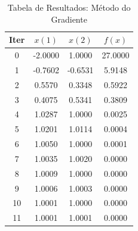 \documentclass[a4paper,12pt,utf8x,notitlepage]{article}
\begin{document}
\begin{table}[!htcb]
  \centering
  \begin{tabular}{|c|c|c|c|}
    \hline
    \rowcolor{kugray5}{}
    Iter  & $x(1)$ & $x(2)$ & $f(x)$\\ \hline
 	 0 &  -2.0000	&  1.0000	  &   27.0000\\  \hline
	 1 &  -0.7602	&  -0.6531  &   	5.9148\\  \hline
	 2 &  0.5570	&  0.3348	  &   0.5922\\  \hline
	 3 &  0.4075	&  0.5341	  &   0.3809\\  \hline
	 4 &  1.0287	&  1.0000	  &   0.0025\\  \hline
	 5 &  1.0201	&  1.0114	  &   0.0004\\  \hline
	 6 &  1.0050	&  1.0000	  &   0.0001\\  \hline
	 7 &  1.0035	&  1.0020	  &   0.0000\\  \hline
	 8 &  1.0009	&  1.0000	  &   0.0000\\  \hline
	 9 &  1.0006	&  1.0003	  &   0.0000\\  \hline
	 10 &  1.0001	&  1.0000	  &   0.0000\\  \hline
    \rowcolor{red!40}{}
	 11 &  1.0001	&  1.0001	  &   0.0000\\  \hline
  \end{tabular}
  \caption{Tabela de Resultados: Método do Gradiente}
  \label{tab:res_stp}
\end{table}
\end{document}
